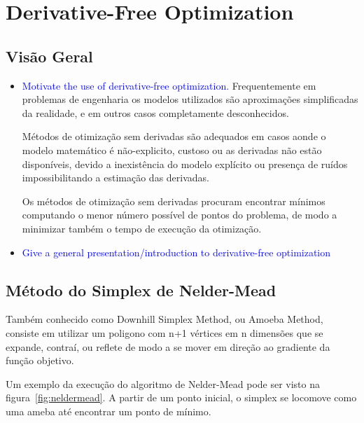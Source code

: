 \chapter{Derivative-Free Optimization} \label{chap:3}


\section{Visão Geral}

\begin{itemize}


\item \textcolor{blue}{Motivate the use of derivative-free optimization.}
Frequentemente em problemas de engenharia os modelos utilizados são aproximações simplificadas da realidade, e em outros casos completamente desconhecidos.

Métodos de otimização sem derivadas são adequados em casos aonde o modelo matemático é não-explicito, custoso ou as derivadas não estão disponíveis, devido a inexistência do modelo explícito ou presença de ruídos impossibilitando a estimação das derivadas.

Os métodos de otimização sem derivadas procuram encontrar mínimos computando o menor número possível de pontos do problema, de modo a minimizar também o tempo de execução da otimização.



\item \textcolor{blue}{Give a general presentation/introduction to derivative-free optimization}

\end{itemize}


\section{Método do Simplex de Nelder-Mead}

Também conhecido como Downhill Simplex Method, ou Amoeba Method, consiste em utilizar um poligono com n+1 vértices em n dimensões que se expande, contraí, ou reflete de modo a se mover em direção ao gradiente da função objetivo.

Um exemplo da execução do algoritmo de Nelder-Mead pode ser visto na figura~\ref{fig:neldermead}. A partir de um ponto inicial, o simplex se locomove como uma ameba até encontrar um ponto de mínimo.

